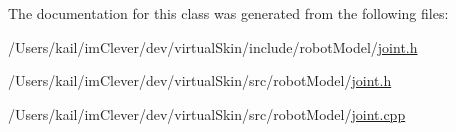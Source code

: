 The documentation for this class was generated from the following files:\begin{DoxyCompactItemize}
\item 
/Users/kail/imClever/dev/virtualSkin/include/robotModel/\hyperlink{include_2robot_model_2joint_8h}{joint.h}\item 
/Users/kail/imClever/dev/virtualSkin/src/robotModel/\hyperlink{src_2robot_model_2joint_8h}{joint.h}\item 
/Users/kail/imClever/dev/virtualSkin/src/robotModel/\hyperlink{joint_8cpp}{joint.cpp}\end{DoxyCompactItemize}
